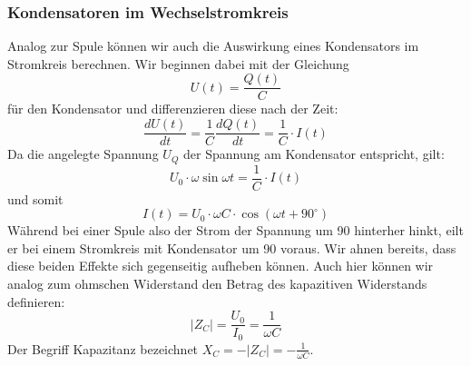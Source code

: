 \subsubsection{Kondensatoren im Wechselstromkreis}
Analog zur Spule können wir auch die Auswirkung eines Kondensators im Stromkreis berechnen.\cite{Demtroeder} %
Wir beginnen dabei mit der Gleichung
\begin{equation}
U(t) = \frac{Q(t)}{C}
\end{equation}
für den Kondensator und differenzieren diese nach der Zeit:
\begin{equation}
\frac{dU(t)}{dt} = \frac{1}{C}\frac{dQ(t)}{dt} = \frac{1}{C} \cdot I(t)
\end{equation}
Da die angelegte Spannung $U_Q$ der Spannung am Kondensator entspricht, gilt:
\begin{equation}
U_0\cdot \omega \sin \omega t = \frac{1}{C} \cdot I(t)
\end{equation}
und somit
\begin{equation}
I(t) = U_0\cdot \omega C \cdot\cos\left( \omega t + 90^\circ\right)
\end{equation}
Während bei einer Spule also der Strom der Spannung um \unit{90}{\degree} hinterher hinkt, eilt er bei einem Stromkreis mit Kondensator um \unit{90}{\degree} voraus. Wir ahnen bereits, dass diese beiden Effekte sich gegenseitig aufheben können.
Auch hier können wir analog zum ohmschen Widerstand den Betrag des kapazitiven Widerstands definieren:
\begin{equation}
\left|Z_C\right| = \frac{U_0}{I_0} = \frac{1}{\omega C}
\end{equation}
Der Begriff Kapazitanz bezeichnet $X_C = -\left|Z_C\right| = -\frac{1}{\omega C}$.

